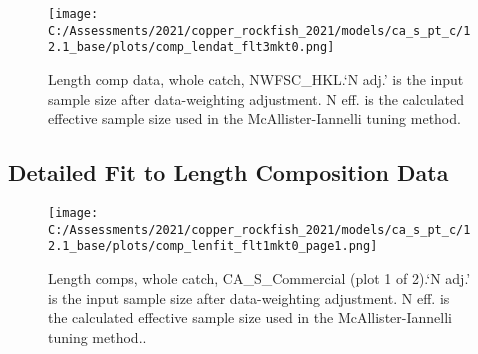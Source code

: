 \documentclass[11pt,
  english,
  a4paper,
]{article}
\begin{document}
\tagmcend\tagstructend


\begin{figure}
\centering
\texttt{[image: C:/Assessments/2021/copper\_rockfish\_2021/models/ca\_s\_pt\_c/12.1\_base/plots/comp\_lendat\_flt3mkt0.png]}
\caption{Length comp data, whole catch, NWFSC\_HKL.`N adj.' is the input sample size after data-weighting adjustment. N eff. is the calculated effective sample size used in the McAllister-Iannelli tuning method.\label{fig:comp_lendat_flt3mkt0}}
\end{figure}

\tagmcend\tagstructend

\newpage


\hypertarget{length-fit}{%
\subsection{Detailed Fit to Length Composition Data}\label{length-fit}}

\leavevmode\tagmcend\tagstructend


\begin{figure}
\centering
\texttt{[image: C:/Assessments/2021/copper\_rockfish\_2021/models/ca\_s\_pt\_c/12.1\_base/plots/comp\_lenfit\_flt1mkt0\_page1.png]}
\caption{Length comps, whole catch, CA\_S\_Commercial (plot 1 of 2).`N adj.' is the input sample size after data-weighting adjustment. N eff. is the calculated effective sample size used in the McAllister-Iannelli tuning method..\label{fig:comp_lenfit_flt1mkt0_page1}}
\end{figure}

\tagmcend\tagstructend

\end{document}
